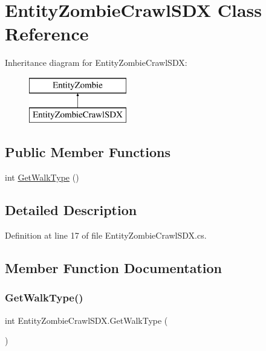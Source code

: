 \hypertarget{class_entity_zombie_crawl_s_d_x}{}\section{Entity\+Zombie\+Crawl\+S\+DX Class Reference}
\label{class_entity_zombie_crawl_s_d_x}
Inheritance diagram for Entity\+Zombie\+Crawl\+S\+DX\+:\begin{figure}[H]
\begin{center}
\leavevmode
\includegraphics[height=2.000000cm]{de/d80/class_entity_zombie_crawl_s_d_x}
\end{center}
\end{figure}
\subsection*{Public Member Functions}
\begin{DoxyCompactItemize}
\item 
int \mbox{\hyperlink{class_entity_zombie_crawl_s_d_x_af7241973a6da363edabc8350b30b55bb}{Get\+Walk\+Type}} ()
\end{DoxyCompactItemize}


\subsection{Detailed Description}


Definition at line 17 of file Entity\+Zombie\+Crawl\+S\+D\+X.\+cs.



\subsection{Member Function Documentation}
\mbox{\label{class_entity_zombie_crawl_s_d_x_af7241973a6da363edabc8350b30b55bb}} 
\subsubsection{\texorpdfstring{GetWalkType()}{GetWalkType()}}
{\footnotesize\ttfamily int Entity\+Zombie\+Crawl\+S\+D\+X.\+Get\+Walk\+Type (\begin{DoxyParamCaption}{ }\end{DoxyParamCaption})}



